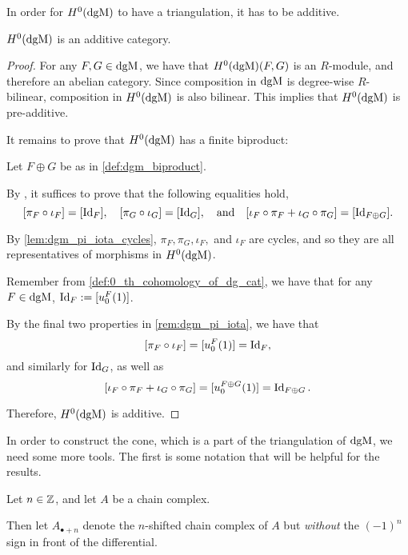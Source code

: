 In order for \( H^0(\operatorname{dgM}) \) to have a triangulation, it has to be additive.

\begin{lemma}
    \( H^0(\operatorname{dgM}) \) is an additive category.
\end{lemma}
\begin{proof}
    For any \( F, G \in \operatorname{dgM} \), we have that \( H^0(\operatorname{dgM})(F, G) \) is an \( R \)-module, and therefore an abelian category. Since composition in \( \operatorname{dgM} \) is degree-wise \( R \)-bilinear, composition in \( H^0(\operatorname{dgM}) \) is also bilinear. This implies that \( H^0(\operatorname{dgM}) \) is pre-additive.

    It remains to prove that \( H^0(\operatorname{dgM}) \) has a finite biproduct:

    Let \( F \oplus G \) be as in \autoref{def:dgm_biproduct}.
    
    By \cite[p.\ 250]{Mac_Lane_1995}, it suffices to prove that the following equalities hold,
    \[
        [\pi_F \circ \iota_F] = [\operatorname{Id}_F], \quad [\pi_G \circ \iota_G] = [\operatorname{Id}_G], \quad \text{and} \quad [\iota_F \circ \pi_F + \iota_G \circ \pi_G] = [\operatorname{Id}_{F \oplus G}].
    \]

    By \autoref{lem:dgm_pi_iota_cycles}, \( \pi_F, \pi_G, \iota_F, \) and \( \iota_F \) are cycles, and so they are all representatives of morphisms in \( H^0(\operatorname{dgM}) \).

    Remember from \autoref{def:0_th_cohomology_of_dg_cat}, we have that for any \( F \in \operatorname{dgM} \), \( \operatorname{Id}_F := [u_0^F ( 1 )] \).

    By the final two properties in \autoref{rem:dgm_pi_iota}, we have that
    \[
        [\pi_F \circ \iota_F] = [u_0^F (1)] = \operatorname{Id}_F,
    \]
    and similarly for \( \operatorname{Id}_G \), as well as
    \[
        [\iota_F \circ \pi_F + \iota_G \circ \pi_G] = [u_0^{F \oplus G} (1)] = \operatorname{Id}_{F \oplus G}.
    \]

    Therefore, \( H^0(\operatorname{dgM}) \) is additive.
\end{proof}

In order to construct the cone, which is a part of the triangulation of \( \operatorname{dgM} \), we need some more tools. The first is some notation that will be helpful for the results.

\begin{notation}
    Let \( n \in {\mathbb{Z}} \), and let \( A \) be a chain complex.
    
    Then let \( A_{\bullet+n} \) denote the \( n \)-shifted chain complex of \( A \) but \emph{without} the \( (-1)^n \) sign in front of the differential.
\end{notation}

